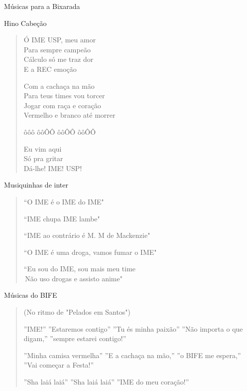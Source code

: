 \begin{secao}{Músicas para a Bixarada}

\begin{subsecao}{Hino Cabeção}
\begin{verse}

Ó IME USP, meu amor\\
Para sempre campeão\\
Cálculo só me traz dor\\
E a REC emoção

Com a cachaça na mão\\
Para teus times vou torcer\\
Jogar com raça e coração\\
Vermelho e branco até morrer

ôôô ôôÔÔ ôôÔÔ ôôÔÔ

Eu vim aqui\\
Só pra gritar\\
Dá-lhe! IME! USP!
\end{verse}
\end{subsecao}

\begin{subsecao}{Musiquinhas de inter}
\begin{verse}

``O IME é o IME do IME"

``IME chupa IME lambe"

``IME ao contrário é M. M de Mackenzie"

``O IME é uma droga, vamos fumar o IME"

``Eu sou do IME, sou mais meu time\\ 
\,Não uso drogas e assisto anime"

\end{verse}
\end{subsecao}
\pagebreak

\begin{subsecao}{Músicas do BIFE}
\begin{verse}

(No ritmo de "Pelados em Santos")

''IME!''
''Estaremos contigo''
''Tu és minha paixão''
''Não importa o que digam,''
''sempre estarei contigo!''

''Minha camisa vermelha''
''E a cachaça na mão,''
''o BIFE me espera,''
''Vai começar a Festa!''

''Sha laiá laiá''
''Sha laiá laiá''
''IME do meu coração!''

\end{verse}
\end{subsecao}
\pagebreak


\end{secao}
